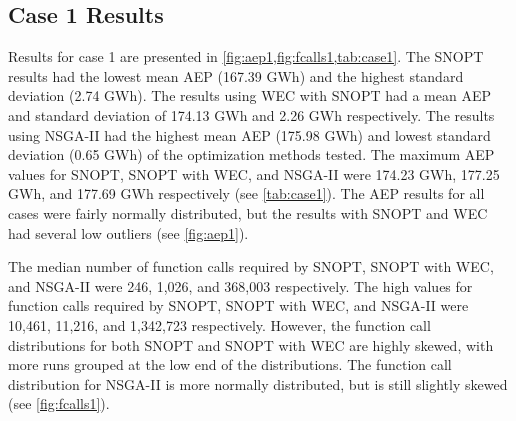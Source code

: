\documentclass[a4paper]{jpconf}
\begin{document}
\subsection{Case 1 Results}
Results for case 1 are presented in \cref{fig:aep1,fig:fcalls1,tab:case1}. The SNOPT results had the lowest mean AEP (167.39 GWh) and the highest standard deviation (2.74 GWh). The results using WEC with SNOPT had a mean AEP and standard deviation of 174.13 GWh and 2.26 GWh respectively. The results using NSGA-II had the highest mean AEP (175.98 GWh) and lowest standard deviation (0.65 GWh) of the optimization methods tested. The maximum AEP values for SNOPT, SNOPT with WEC, and NSGA-II were 174.23 GWh, 177.25 GWh, and 177.69 GWh respectively (see \cref{tab:case1}). The AEP results for all cases were fairly normally distributed, but the results with SNOPT and WEC had several low outliers (see \cref{fig:aep1}).

 The median number of function calls required by SNOPT, SNOPT with WEC, and NSGA-II were 246, 1,026, and 368,003 respectively. The high values for function calls required by SNOPT, SNOPT with WEC, and NSGA-II were 10,461, 11,216, and 1,342,723 respectively. However, the function call distributions for both SNOPT and SNOPT with WEC are highly skewed, with more runs grouped at the low end of the distributions. The function call distribution for NSGA-II is more normally distributed, but is still slightly skewed (see \cref{fig:fcalls1}).
\end{document}
